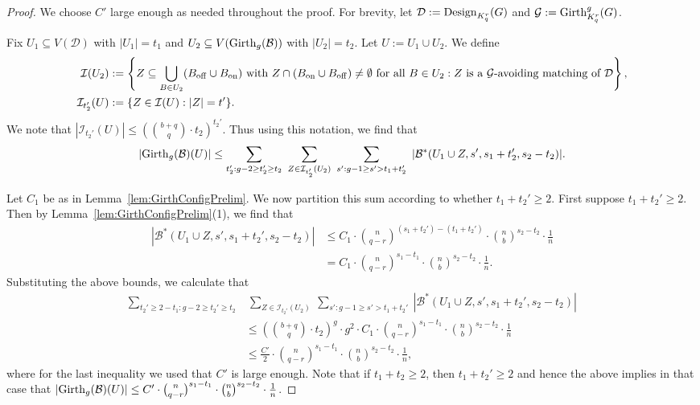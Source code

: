 \documentclass[11pt]{article}
\newcommand{\mc}[1]{\mathcal{#1}}
\newcounter{i}
\theoremstyle{plain}
\theoremstyle{plain} %
\theoremstyle{definition}
\begin{document}
\begin{proof}
We choose $C'$ large enough as needed throughout the proof. For brevity, let $\mc{D}:={\rm Design}_{K_q^r}(G)$ and $\mc{G}:= {\rm Girth}_{K_q^r}^g(G)$. 

Fix $U_1\subseteq V(\mc{D})$ with $|U_1|=t_1$ and $U_2\subseteq V({\rm Girth}_g(\mc{B}))$ with $|U_2|=t_2$. Let $U:= U_1\cup U_2$. We define
\begin{align*}
\mc{I}(U_2) &:= \left\{Z\subseteq \bigcup_{B\in U_2} (B_{\rm off}\cup B_{\rm on}) \text{ with } Z\cap ( B_{\rm on}\cup B_{\rm off}) \ne \emptyset \text{ for all } B\in U_2: Z\text{ is a } \mc{G}\text{-avoiding matching of } \mc{D}\right\},\\
\mc{I}_{t_2'}(U) &:= \{Z\in \mc{I}(U): |Z|=t'\}.    
\end{align*}
We note that $|\mc{I}_{t_2'}(U)|\le \left(\binom{b+q}{q}\cdot t_2\right)^{t_2'}$. Thus using this notation, we find that
$$|{\rm Girth}_g(\mc{B})(U)| \le \sum_{t_2': g-2\ge t_2' \ge t_2} ~\sum_{Z\in \mc{I}_{t_2'}(U_2)}~\sum_{s': g-1\ge s' > t_1+t_2'}~|\mc{B}^{*}(U_1\cup Z,s',s_1+t_2',s_2-t_2)|.$$

Let $C_1$ be as in Lemma~\ref{lem:GirthConfigPrelim}. We now partition this sum according to whether $t_1+t_2'\ge 2$. First suppose $t_1+t_2'\ge 2$. Then by Lemma~\ref{lem:GirthConfigPrelim}(1), we find that
\begin{align*}
|\mc{B}^{*}(U_1\cup Z,s',s_1+t_2',s_2-t_2)| &\le C_1\cdot \binom{n}{q-r}^{(s_1+t_2')-(t_1+t_2')} \cdot \binom{n}{b}^{s_2-t_2}\cdot \frac{1}{n}\\
&= C_1\cdot \binom{n}{q-r}^{s_1-t_1} \cdot \binom{n}{b}^{s_2-t_2}\cdot \frac{1}{n}.
\end{align*}
Substituting the above bounds, we calculate that
\begin{align*}
\sum_{t_2'\ge 2-t_1: g-2\ge t_2' \ge t_2}&~\sum_{Z\in \mc{I}_{t_2'}(U_2)}~\sum_{s': g-1\ge s' > t_1+t_2'}~|\mc{B}^{*}(U_1\cup Z,s',s_1+t_2',s_2-t_2)| \\
&\le \left(\binom{b+q}{q}\cdot t_2\right)^{g} \cdot g^2 \cdot C_1\cdot \binom{n}{q-r}^{s_1-t_1} \cdot \binom{n}{b}^{s_2-t_2}\cdot \frac{1}{n}\\
&\le \frac{C'}{2}\cdot \binom{n}{q-r}^{s_1-t_1} \cdot \binom{n}{b}^{s_2-t_2}\cdot \frac{1}{n},
\end{align*}
where for the last inequality we used that $C'$ is large enough. Note that if $t_1+t_2\ge 2$, then $t_1+t_2' \ge 2$ and hence the above implies in that case that $|{\rm Girth}_g(\mc{B})(U)|\le C' \cdot \binom{n}{q-r}^{s_1-t_1} \cdot \binom{n}{b}^{s_2-t_2}\cdot \frac{1}{n}$. 


\end{proof}
\end{document}
